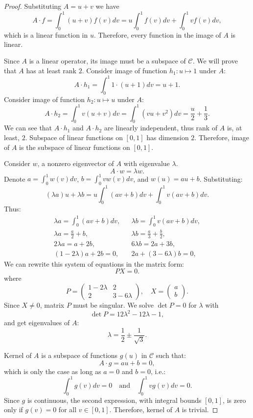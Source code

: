 \documentclass{article}
\theoremstyle{definition}
\begin{document}
\begin{proof}

Substituting $A = u+v$ we have
\[ A \cdot f = \int_0^1 (u+v) f(v) dv = u\int_0^1 f(v) dv + \int_0^1 v f(v) dv, \]
which is a linear function in $u$.
Therefore, every function in the image of $A$ is linear.

Since $A$ is a linear operator, its image must be a subspace of $\mathcal{C}$.
We will prove that $A$ has at least rank $2$.
Consider image of function $h_1 : u \mapsto 1$ under $A$:
\[ 
    A \cdot h_1
    = \int_0^1 1 \cdot (u+1) dv 
    = u+1.
\]
Consider image of function $h_2 : u \mapsto u$ under $A$:
\[
    A \cdot h_2
    = \int_0^1 v (u+v) dv 
    = \int_0^1 (vu + v^2) dv 
    = \frac{u}{2} + \frac{1}{3}.
\]
We can see that $A \cdot h_1$ and $A \cdot h_2$ are linearly independent, thus rank of $A$ is, at least, $2$.
Subspace of linear functions on $[0,1]$ has dimension $2$.
Therefore, image of $A$ is the subspace of linear functions on $[0,1]$.

Consider $w$, a nonzero eigenvector of $A$ with eigenvalue $\lambda$.
\[ A \cdot w = \lambda w. \]
Denote $a = \int_0^1 w(v) dv$, $b = \int_0^1 v w(v) dv$, and $w(u) = au+b$.
Substituting:
\[ (\lambda a) u + \lambda b = u \int_0^1 (av+b) dv + \int_0^1 v(av+b) dv. \]
Thus:
\begin{align*}
    \lambda a = \int_0^1 (av+b) dv, &&
    \lambda b = \int_0^1 v(av+b) dv, \\
    \lambda a = \frac{a}{2} + b, && 
    \lambda b = \frac{a}{3} + \frac{b}{2}, \\
    2 \lambda a = a + 2b, &&
    6 \lambda b = 2a + 3b, \\
    (1-2\lambda)a + 2b = 0, &&
    2a + (3-6\lambda)b = 0,
\end{align*}
We can rewrite this system of equations in the matrix form:
\[
    P
    X
    = 0.
\]
where 
\[
    P =
    \begin{pmatrix}
        1-2\lambda & 2 \\
        2 & 3-6\lambda
    \end{pmatrix},
    \quad
    X = 
    \begin{pmatrix}
        a \\
        b
    \end{pmatrix}.
\]
Since $X \neq 0$, matrix $P$ must be singular.
We solve $\det P = 0$ for $\lambda$ with
\[ \det P = 12 \lambda^2 - 12 \lambda - 1, \]
 and get eigenvalues of $A$:
 \[ \lambda = \frac{1}{2} \pm \frac{1}{\sqrt{3}}. \]

Kernel of $A$ is a subspace of functions $g(u)$ in $\mathcal{C}$ such that:
\[ A \cdot g = au + b = 0, \]
which is only the case as long as $a = 0$ and $b = 0$, i.e.:
\[  \int_0^1 g(v) dv = 0 \quad \text{and} \quad \int_0^1 v g(v) dv = 0. \]
Since $g$ is continuous, the second expression, with integral bounds $[0,1]$, is zero only if $g(v) = 0$ for all $v \in [0,1]$.
Therefore, kernel of $A$ is trivial.

\end{proof}
\end{document}
